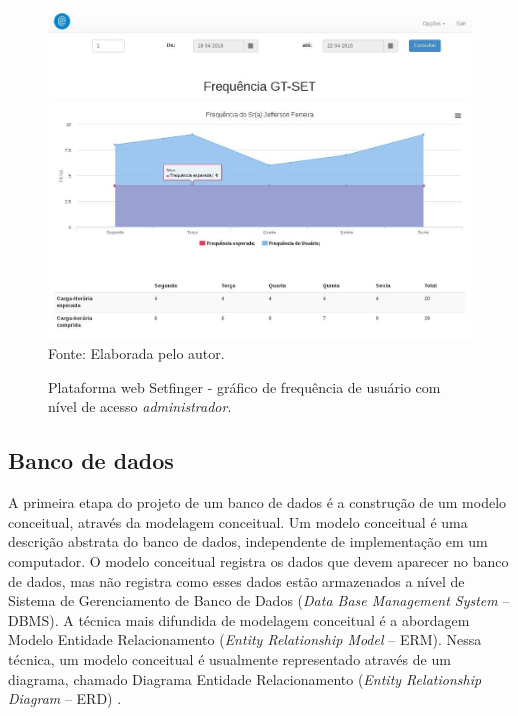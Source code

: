 \begin{itemize}
  
    \begin{figure}[!ht]
    \begin{center}
    \caption{Plataforma web Setfinger - gráfico de frequência de usuário com nível de acesso \textit{administrador}.}
     \includegraphics[scale=0.5]{figuras/cap4/web_frequencia_admin.jpg}\\
    Fonte: Elaborada pelo autor.
    \label{web_frequencia_admin}
    \end{center}
    \end{figure}
  
  
    
  \end{itemize}  
  
  
  
\subsection{Banco de dados}


A primeira etapa do projeto de um banco de dados é a construção de um modelo conceitual, através da modelagem conceitual. Um modelo conceitual é uma descrição abstrata do banco de dados, independente de implementação em um computador. O modelo conceitual registra os dados que devem aparecer no banco de dados, mas não registra como esses dados estão armazenados a nível de Sistema de Gerenciamento de Banco de Dados (\textit{Data Base Management System} -- DBMS). A técnica mais difundida de modelagem conceitual é a abordagem Modelo Entidade Relacionamento (\textit{Entity Relationship Model} -- ERM). Nessa técnica, um modelo conceitual é usualmente representado através de um diagrama, chamado Diagrama Entidade Relacionamento (\textit{Entity Relationship Diagram} -- ERD) \cite{heuser2009projeto}.

